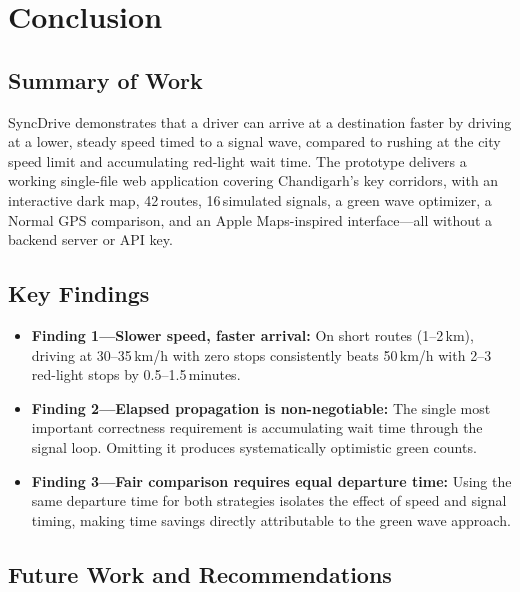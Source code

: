 \documentclass[12pt,a4paper]{report}
\begin{document}
\chapter{Conclusion}

\section{Summary of Work}

SyncDrive demonstrates that a driver can arrive at a destination faster by
driving at a lower, steady speed timed to a signal wave, compared to rushing
at the city speed limit and accumulating red-light wait time. The prototype
delivers a working single-file web application covering Chandigarh's key
corridors, with an interactive dark map, 42\,routes, 16\,simulated signals, a
green wave optimizer, a Normal GPS comparison, and an Apple Maps-inspired
interface---all without a backend server or API key.

\section{Key Findings}

\begin{itemize}
  \item \textbf{Finding 1---Slower speed, faster arrival:} On short routes
        (1--2\,km), driving at 30--35\,km/h with zero stops consistently
        beats 50\,km/h with 2--3 red-light stops by 0.5--1.5\,minutes.
  \item \textbf{Finding 2---Elapsed propagation is non-negotiable:} The
        single most important correctness requirement is accumulating wait
        time through the signal loop. Omitting it produces systematically
        optimistic green counts.
  \item \textbf{Finding 3---Fair comparison requires equal departure time:}
        Using the same departure time for both strategies isolates the effect
        of speed and signal timing, making time savings directly attributable
        to the green wave approach.
\end{itemize}

\section{Future Work and Recommendations}
\end{document}
